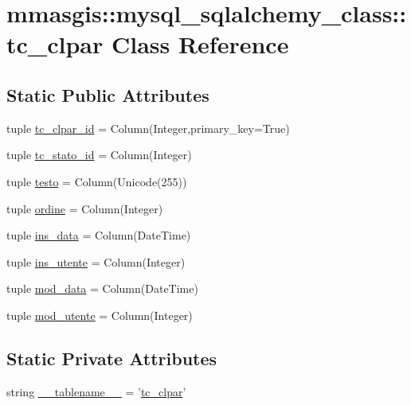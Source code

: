 \hypertarget{classmmasgis_1_1mysql__sqlalchemy__class_1_1tc__clpar}{
\section{mmasgis::mysql\_\-sqlalchemy\_\-class::tc\_\-clpar Class Reference}
\label{classmmasgis_1_1mysql__sqlalchemy__class_1_1tc__clpar}
}
\subsection*{Static Public Attributes}
\begin{DoxyCompactItemize}
\item 
tuple \hyperlink{classmmasgis_1_1mysql__sqlalchemy__class_1_1tc__clpar_a2a1686c28f4fc4303c082bf6eccffbc9}{tc\_\-clpar\_\-id} = Column(Integer,primary\_\-key=True)
\item 
tuple \hyperlink{classmmasgis_1_1mysql__sqlalchemy__class_1_1tc__clpar_a9e856ce8a373e82123d1cfa50695ff8b}{tc\_\-stato\_\-id} = Column(Integer)
\item 
tuple \hyperlink{classmmasgis_1_1mysql__sqlalchemy__class_1_1tc__clpar_a5b4d74cfadaa49b9a580a85758bacac1}{testo} = Column(Unicode(255))
\item 
tuple \hyperlink{classmmasgis_1_1mysql__sqlalchemy__class_1_1tc__clpar_ade55911b6c8ae5145047c0a9e77a8abb}{ordine} = Column(Integer)
\item 
tuple \hyperlink{classmmasgis_1_1mysql__sqlalchemy__class_1_1tc__clpar_a5b1a45cc06389207ad9f78a567cfb35f}{ins\_\-data} = Column(DateTime)
\item 
tuple \hyperlink{classmmasgis_1_1mysql__sqlalchemy__class_1_1tc__clpar_ab0131f0424504026879fd4e2bdef1348}{ins\_\-utente} = Column(Integer)
\item 
tuple \hyperlink{classmmasgis_1_1mysql__sqlalchemy__class_1_1tc__clpar_ab89f13f40d6c877f156ccaeeed43288a}{mod\_\-data} = Column(DateTime)
\item 
tuple \hyperlink{classmmasgis_1_1mysql__sqlalchemy__class_1_1tc__clpar_afe5b19087a7455aa17e21cdacbca1859}{mod\_\-utente} = Column(Integer)
\end{DoxyCompactItemize}
\subsection*{Static Private Attributes}
\begin{DoxyCompactItemize}
\item 
string \hyperlink{classmmasgis_1_1mysql__sqlalchemy__class_1_1tc__clpar_ae8061482d8ba32759a52b771711b5ee5}{\_\-\_\-tablename\_\-\_\-} = '\hyperlink{classmmasgis_1_1mysql__sqlalchemy__class_1_1tc__clpar}{tc\_\-clpar}'
\end{DoxyCompactItemize}



